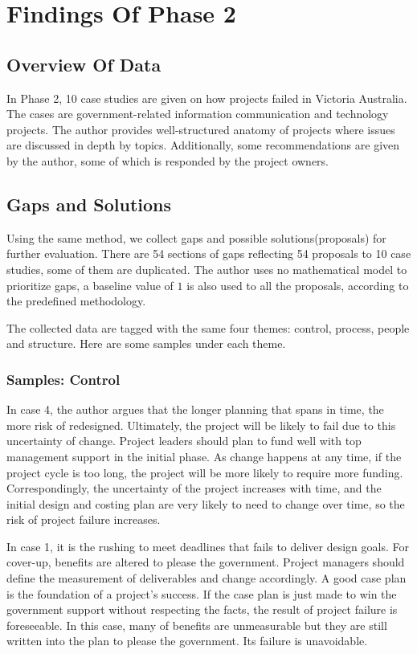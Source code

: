 
\section{Findings Of Phase 2}

\subsection{Overview Of Data}
In Phase 2, 10 case studies are given on how projects failed in Victoria Australia. The cases are government-related information communication and technology projects. The author\parencite{case_study} provides well-structured anatomy of projects where issues are discussed in depth by topics. Additionally, some recommendations are given by the author, some of which is responded by the project owners.

\subsection{Gaps and Solutions}
Using the same method, we collect gaps and possible solutions(proposals) for further evaluation. There are 54 sections of gaps reflecting 54 proposals to 10 case studies, some of them are duplicated. The author uses no mathematical model to prioritize gaps, a baseline value of $1$ is also used to all the proposals, according to the predefined methodology.

The collected data are tagged with the same four themes: control, process, people and structure. Here are some samples under each theme.

\subsubsection{Samples: Control}
In case 4, the author argues that the longer planning that spans in time, the more risk of redesigned. Ultimately, the project will be likely to fail due to this uncertainty of change. Project leaders should plan to fund well with top management support in the initial phase. As change happens at any time, if the project cycle is too long, the project will be more likely to require more funding. Correspondingly, the uncertainty of the project increases with time, and the initial design and costing plan are very likely to need to change over time, so the risk of project failure increases.


In case 1, it is the rushing to meet deadlines that fails to deliver design goals. For cover-up, benefits are altered to please the government. Project managers should define the measurement of deliverables and change accordingly. A good case plan is the foundation of a project's success. If the case plan is just made to win the government support without respecting the facts, the result of project failure is foreseeable. In this case, many of benefits are unmeasurable but they are still written into the plan to please the government. Its failure is unavoidable.

